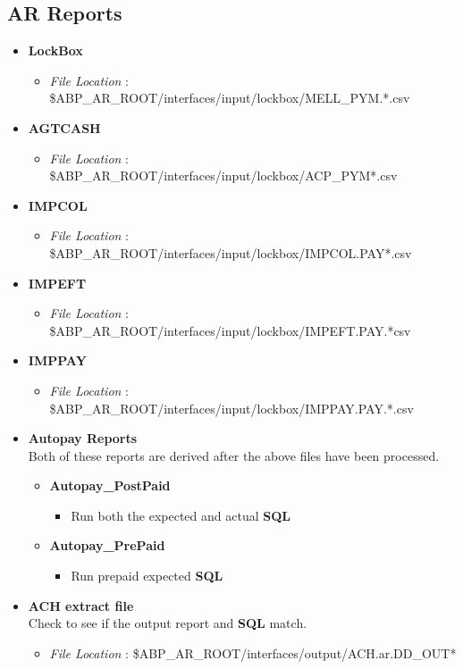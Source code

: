 \documentclass[12pt,twoside]{article}
\begin{document}
\subsection{AR Reports}
\label{sec-11-5}

\begin{itemize}
\item \textbf{LockBox}
\begin{itemize}
\item \emph{File Location} : \$ABP\_AR\_ROOT/interfaces/input/lockbox/MELL\_PYM.*.csv
\end{itemize}
\item \textbf{AGTCASH}
\begin{itemize}
\item \emph{File Location} : \$ABP\_AR\_ROOT/interfaces/input/lockbox/ACP\_PYM*.csv
\end{itemize}
\item \textbf{IMPCOL}
\begin{itemize}
\item \emph{File Location} : \$ABP\_AR\_ROOT/interfaces/input/lockbox/IMPCOL.PAY*.csv
\end{itemize}
\item \textbf{IMPEFT}
\begin{itemize}
\item \emph{File Location} : \$ABP\_AR\_ROOT/interfaces/input/lockbox/IMPEFT.PAY.*csv
\end{itemize}
\item \textbf{IMPPAY}
\begin{itemize}
\item \emph{File Location} : \$ABP\_AR\_ROOT/interfaces/input/lockbox/IMPPAY.PAY.*.csv
\end{itemize}
\item \textbf{Autopay Reports} \\ Both of these reports are derived after the above files have been processed.
\begin{itemize}
\item \textbf{Autopay\_PostPaid}
\begin{itemize}
\item Run both the expected and actual \textbf{SQL}
\end{itemize}
\item \textbf{Autopay\_PrePaid}
\begin{itemize}
\item Run prepaid expected \textbf{SQL}
\end{itemize}
\end{itemize}
\item \textbf{ACH extract file} \\Check to see if the output report and \textbf{SQL} match.
\begin{itemize}
\item \emph{File Location} : \$ABP\_AR\_ROOT/interfaces/output/ACH.ar.DD\_OUT*\\
\end{itemize}
\end{itemize}
\end{document}
